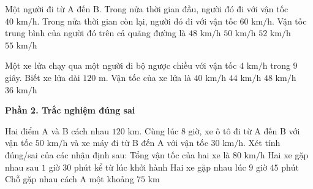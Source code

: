 \begin{ex} %
Một người đi từ A đến B. Trong nửa thời gian đầu, người đó đi với vận tốc $40\text{ km/h}$. Trong nửa thời gian còn lại, người đó đi với vận tốc $60\text{ km/h}$. Vận tốc trung bình của người đó trên cả quãng đường là
\choice
{$48\text{ km/h}$}
{\True $50\text{ km/h}$}
{$52\text{ km/h}$}
{$55\text{ km/h}$}
\end{ex}

\begin{ex} %
Một xe lửa chạy qua một người đi bộ ngược chiều với vận tốc $4\text{ km/h}$ trong $9$ giây. Biết xe lửa dài $120\text{ m}$. Vận tốc của xe lửa là
\choice
{$40\text{ km/h}$}
{\True $44\text{ km/h}$}
{$48\text{ km/h}$}
{$36\text{ km/h}$}
\end{ex}

\textbf{Phần 2. Trắc nghiệm đúng sai}

\begin{ex} %
Hai điểm A và B cách nhau $120\text{ km}$. Cùng lúc $8\text{ giờ}$, xe ô tô đi từ A đến B với vận tốc $50\text{ km/h}$ và xe máy đi từ B đến A với vận tốc $30\text{ km/h}$. Xét tính đúng/sai của các nhận định sau:
\choiceTF
{\True Tổng vận tốc của hai xe là $80\text{ km/h}$}
{\True Hai xe gặp nhau sau $1$ giờ $30$ phút kể từ lúc khởi hành}
{Hai xe gặp nhau lúc $9\text{ giờ } 45\text{ phút}$}
{\True Chỗ gặp nhau cách A một khoảng $75\text{ km}$}
\end{ex}

